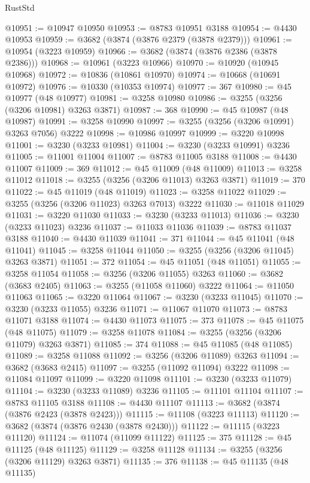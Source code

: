 \begin{lexlean}{RustStd}
\begin{coremodule}
{\begin{coremodule}
{{{{{{{{{{{{{{{{{{{{{{{{{{{{{{{{{{{{{@10951 := @10947 @10950
@10953 := @8783 @10951 @3188
@10954 := @4430 @10953
@10959 := @3682 (@3874 (@3876 @2379 (@3878 @2379)))
@10961 := @10954 (@3223 @10959)
@10966 := @3682 (@3874 (@3876 @2386 (@3878 @2386)))
@10968 := @10961 (@3223 @10966)
@10970 := @10920 (@10945 @10968)
@10972 := @10836 (@10861 @10970)
@10974 := @10668 (@10691 @10972)
@10976 := @10330 (@10353 @10974)
@10977 := 367
@10980 := @45 @10977 (@48 @10977)
@10981 := @3258 @10980
@10986 := @3255 (@3256 (@3206 @10981) @3263 @3871)
@10987 := 368
@10990 := @45 @10987 (@48 @10987)
@10991 := @3258 @10990
@10997 := @3255 (@3256 (@3206 @10991) @3263 @7056) @3222
@10998 := @10986 @10997
@10999 := @3220 @10998
@11001 := @3230 (@3233 @10981)
@11004 := @3230 (@3233 @10991) @3236
@11005 := @11001 @11004
@11007 := @8783 @11005 @3188
@11008 := @4430 @11007
@11009 := 369
@11012 := @45 @11009 (@48 @11009)
@11013 := @3258 @11012
@11018 := @3255 (@3256 (@3206 @11013) @3263 @3871)
@11019 := 370
@11022 := @45 @11019 (@48 @11019)
@11023 := @3258 @11022
@11029 := @3255 (@3256 (@3206 @11023) @3263 @7013) @3222
@11030 := @11018 @11029
@11031 := @3220 @11030
@11033 := @3230 (@3233 @11013)
@11036 := @3230 (@3233 @11023) @3236
@11037 := @11033 @11036
@11039 := @8783 @11037 @3188
@11040 := @4430 @11039
@11041 := 371
@11044 := @45 @11041 (@48 @11041)
@11045 := @3258 @11044
@11050 := @3255 (@3256 (@3206 @11045) @3263 @3871)
@11051 := 372
@11054 := @45 @11051 (@48 @11051)
@11055 := @3258 @11054
@11058 := @3256 (@3206 @11055) @3263
@11060 := @3682 (@3683 @2405)
@11063 := @3255 (@11058 @11060) @3222
@11064 := @11050 @11063
@11065 := @3220 @11064
@11067 := @3230 (@3233 @11045)
@11070 := @3230 (@3233 @11055) @3236
@11071 := @11067 @11070
@11073 := @8783 @11071 @3188
@11074 := @4430 @11073
@11075 := 373
@11078 := @45 @11075 (@48 @11075)
@11079 := @3258 @11078
@11084 := @3255 (@3256 (@3206 @11079) @3263 @3871)
@11085 := 374
@11088 := @45 @11085 (@48 @11085)
@11089 := @3258 @11088
@11092 := @3256 (@3206 @11089) @3263
@11094 := @3682 (@3683 @2415)
@11097 := @3255 (@11092 @11094) @3222
@11098 := @11084 @11097
@11099 := @3220 @11098
@11101 := @3230 (@3233 @11079)
@11104 := @3230 (@3233 @11089) @3236
@11105 := @11101 @11104
@11107 := @8783 @11105 @3188
@11108 := @4430 @11107
@11113 := @3682 (@3874 (@3876 @2423 (@3878 @2423)))
@11115 := @11108 (@3223 @11113)
@11120 := @3682 (@3874 (@3876 @2430 (@3878 @2430)))
@11122 := @11115 (@3223 @11120)
@11124 := @11074 (@11099 @11122)
@11125 := 375
@11128 := @45 @11125 (@48 @11125)
@11129 := @3258 @11128
@11134 := @3255 (@3256 (@3206 @11129) @3263 @3871)
@11135 := 376
@11138 := @45 @11135 (@48 @11135)
}}}}}}}}}}}}}}}}}}}}}}}}}}}}}}}}}}}}}
\end{coremodule}}
\end{coremodule}
\end{lexlean}

